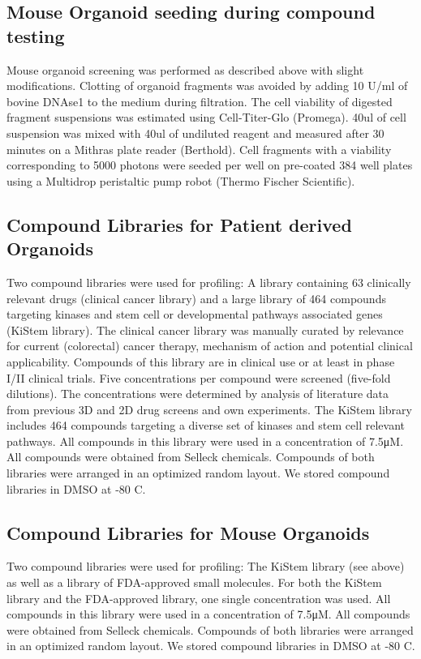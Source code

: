 \begin{flushleft}
\subsection{Mouse Organoid seeding during compound testing}
Mouse organoid screening was performed as described above with slight modifications. Clotting of organoid fragments was avoided by adding 10 U/ml of bovine DNAse1 to the medium during filtration. The cell viability of digested fragment suspensions was estimated using Cell-Titer-Glo (Promega). 40ul of cell suspension was mixed with 40ul of undiluted reagent and measured after 30 minutes on a Mithras plate reader (Berthold). Cell fragments with a viability corresponding to 5000 photons were seeded per well on pre-coated 384 well plates using a Multidrop peristaltic pump robot (Thermo Fischer Scientific). 

\subsection{Compound Libraries for Patient derived Organoids}
Two compound libraries were used for profiling: A library containing 63 clinically relevant drugs (clinical cancer library) and a large library of 464 compounds targeting kinases and stem cell or developmental pathways associated genes (KiStem library). The clinical cancer library was manually curated by relevance for current (colorectal) cancer therapy, mechanism of action and potential clinical applicability. Compounds of this library are in clinical use or at least in phase I/II clinical trials. Five concentrations per compound were screened (five-fold dilutions). The concentrations were determined by analysis of literature data from previous 3D and 2D drug screens and own experiments. The KiStem library includes 464 compounds targeting a diverse set of kinases and stem cell relevant pathways. All compounds in this library were used in a concentration of 7.5μM. All compounds were obtained from Selleck chemicals. Compounds of both libraries were arranged in an optimized random layout. We stored compound libraries in DMSO at -80 C.

\subsection{Compound Libraries for Mouse Organoids}
Two compound libraries were used for profiling: The KiStem library (see above) as well as a library of FDA-approved small molecules. For both the KiStem library and the FDA-approved library, one single concentration was used. All compounds in this library were used in a concentration of 7.5μM. All compounds were obtained from Selleck chemicals. Compounds of both libraries were arranged in an optimized random layout. We stored compound libraries in DMSO at -80 C.


\end{flushleft}
